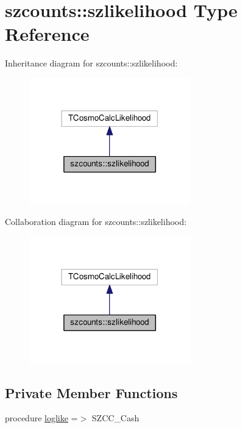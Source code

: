 \hypertarget{structszcounts_1_1szlikelihood}{}\section{szcounts\+:\+:szlikelihood Type Reference}
\label{structszcounts_1_1szlikelihood}


Inheritance diagram for szcounts\+:\+:szlikelihood\+:
\nopagebreak
\begin{figure}[H]
\begin{center}
\leavevmode
\includegraphics[width=198pt]{structszcounts_1_1szlikelihood__inherit__graph}
\end{center}
\end{figure}


Collaboration diagram for szcounts\+:\+:szlikelihood\+:
\nopagebreak
\begin{figure}[H]
\begin{center}
\leavevmode
\includegraphics[width=198pt]{structszcounts_1_1szlikelihood__coll__graph}
\end{center}
\end{figure}
\subsection*{Private Member Functions}
\begin{DoxyCompactItemize}
\item 
procedure \mbox{\hyperlink{structszcounts_1_1szlikelihood_a665a08ba872cde55b79b81117d63c8d2}{loglike}} =$>$ S\+Z\+C\+C\+\_\+\+Cash
\end{DoxyCompactItemize}


